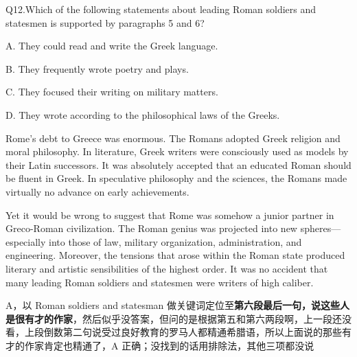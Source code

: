 \begin{blk}
    \begin{qst}
        Q12.Which of the following statements about leading Roman soldiers and statesmen is supported by paragraphs 5 and 6?
    \end{qst}

    \begin{chc}
        A. They could read and write the Greek language.

        B. They frequently wrote poetry and plays.

        C. They focused their writing on military matters.

        D. They wrote according to the philosophical laws of the Greeks.
    \end{chc}

    \begin{psgq}
        Rome’s debt to Greece was enormous. The Romans adopted Greek religion and moral philosophy. In literature, Greek writers were consciously used as models by their Latin successors. It was absolutely accepted that an educated Roman should be fluent in Greek. In speculative philosophy and the sciences, the Romans made virtually no advance on early achievements.

        Yet it would be wrong to suggest that Rome was somehow a junior partner in Greco-Roman civilization. The Roman genius was projected into new spheres—especially into those of law, military organization, administration, and engineering. Moreover, the tensions that arose within the Roman state produced literary and artistic sensibilities of the highest order. It was no accident that many leading Roman soldiers and statesmen were writers of high caliber.
    \end{psgq}

    \begin{nlz}
        A，以 Roman soldiers and statesman 做关键词定位至\textbf{第六段最后一句，说这些人是很有才的作家}，然后似乎没答案，但问的是根据第五和第六两段啊，上一段还没看，上段倒数第二句说受过良好教育的罗马人都精通希腊语，所以上面说的那些有才的作家肯定也精通了，A 正确；没找到的话用排除法，其他三项都没说
    \end{nlz}
\end{blk}
